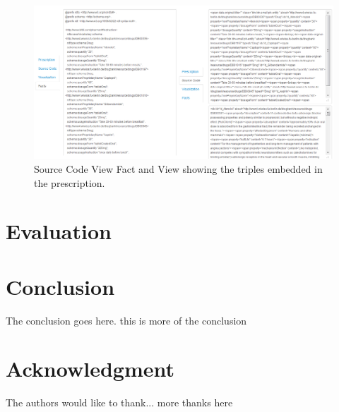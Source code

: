 \documentclass[10pt, conference, compsocconf]{IEEEtran}
\begin{document}
\begin{figure}[tb]
	\centering
		\includegraphics[width=2.0\columnwidth]{images/sc34.png}
	\caption{Source Code View Fact and View showing the triples embedded in the prescription.}
	\label{fig:codeview}
\end{figure}


\section{Evaluation}
\label{evaluation}

\section{Conclusion}
The conclusion goes here. this is more of the conclusion



\section*{Acknowledgment}


The authors would like to thank...
more thanks here








\end{document}
